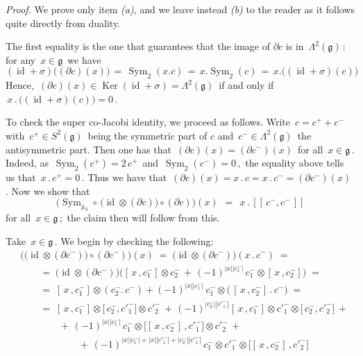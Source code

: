 \documentclass[12pt,reqno,twoside,a4paper]{amsart}
\numberwithin{equation}{section}
\theoremstyle{definition}
\newtheorem{free text}[lema]{}
\theoremstyle{remark}
\newcommand \id{\operatorname{id}}
\newcommand \Sym{\operatorname{Sym}}
\newcommand \Ker{\operatorname{Ker}}
\newcommand{\ot}{\otimes}
\def \lieg{\mathfrak{g}}
\def \pf{\begin{proof}}
\theoremstyle{plain}
\begin{document}
%
%
 \textit{Proof.}
%
 We prove only item  \textit{(a)},  and we leave instead  \textit{(b)\/}  to the reader as it follows quite directly from duality.
                                                       \par
   The first equality is the one that guarantees that the image of  $ \partial c $
is in  $ \, \Lambda^2(\lieg) \, $:  \,for any  $ \, x \in \lieg \, $  we have
%
  $$  (\id+\sigma)\big((\partial c )(x)\big)  \, = \,  \Sym_2(x.c)  \, = \,  x.\Sym_2(c)  \, = \,  x.\big((\id + \sigma)(c)\big)  $$
%
 Hence,  $ \, (\partial c )(x) \in \Ker (\id+\sigma) = \Lambda^2(\lieg) \, $  if and
only if  $ \, x\,.\,\big((\id + \sigma)(c)\big) = 0 \, $.
                                                       \par
   To check the super co-Jacobi identity, we proceed as follows.  Write  $ \, c = c^+ + c^- \, $  with  $ \, c^+ \in S^2(\lieg) \, $  being the symmetric part of $ c $  and  $ \, c^- \in \Lambda^2(\lieg) \, $  the antisymmetric part.  Then
one has that  $ \, (\partial c )(x) = (\partial c^-)(x) \, $  for all  $ \, x \in \lieg \, $.  Indeed, as  $ \, \Sym_2(c^+) = 2\,c^+ \, $  and  $ \, \Sym_2(c^-) = 0 \, $,  \,the equality above tells us that  $ \, x\,.\,c^+ = 0 \, $.  Thus we have that
 $ \, (\partial c )(x)  = x\,.\,c = x\,.\,c^- = (\partial c^-)(x) \, $.  Now we show that
  $$  \big( \Sym_{\mathbb{A}_3} \circ\, \big( \id \ot (\partial c ) \big) \circ (\partial c) \big)(x)  \,\; = \;\,  x\,.\,[\![\, c^- , c^- \,]\!]  $$
%
 for all  $ \, x \in \lieg \, $;  \,the claim then will follow from this.
                                            \par
   Take  $ \, x \in \lieg \, $.  We begin by checking the following:
%
\begin{align*}
%
  &  \big( \big( \id \ot (\partial c^-) \big) \circ (\partial c^-) \big)(x)  \; = \;  \big( \id \ot (\partial c^-) \big)(x\,.\,c^-)  \; =  \\
  &  \qquad   = \;  \big( \id \ot (\partial c^-) \big)\Big( [\,x\,,c^-_1] \ot c^-_2 \, + \, {(-1)}^{|x||c^-_1|} \, c^-_1 \ot [\,x\,,c^-_2] \Big)  \; =  \\
%
%
  &  \qquad   = \;  [\,x\,,c^-_1] \ot (c^-_2.\,c^-) + {(-1)}^{|x||c^-_1|} \, c^-_1 \ot \big(\, [\,x\,,c^-_2]\,.\,c^- \big)  \; =  \\
  &  \qquad  = \;  [\,x\,,c^-_1] \ot \big[\,c^-_2, {c'}^-_1\big] \ot {c'}^-_2 \, + \, {(-1)}^{|c^-_2||{c'}^-_1|} [\,x\,,c^-_1] \ot {c'}^-_1 \ot \big[\,c^-_2,{c'}^-_2\big] \, +  \\
  &  \qquad \qquad   + \, {(-1)}^{|x||c^-_1|} \, c^-_1 \ot \big[ [\,x\,,c^-_2] \, , {c'}^-_1 \big] \ot {c'}^-_2 \, +  \\
  &  \qquad \qquad \qquad   + \, {(-1)}^{|x||c^-_1|+|x||{c'}^-_1|+|c^-_2||{c'}^-_1|} \, c^-_1 \ot {c'}^-_1 \ot \big[ [\,x\,,c^-_2] \, , {c'}^-_2 \big]
%
\end{align*}
\end{document}
